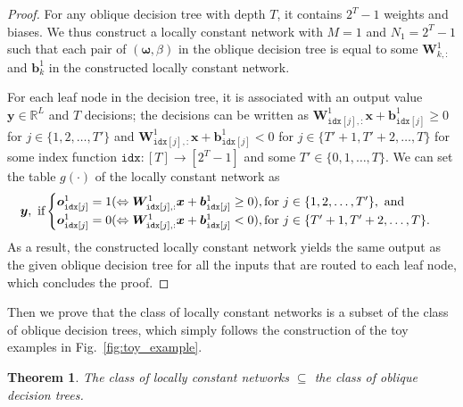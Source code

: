 \documentclass{article} \usepackage{iclr2020_conference,times}
\newtheorem{theorem}{Theorem}\newtheorem{definition}[theorem]{Definition}
\def\vb{{\bm{b}}}
\def\vo{{\bm{o}}}
\def\vomega{{\bm{\omega}}}
\def\vx{{\bm{x}}}
\def\vy{{\bm{y}}}
\def\mW{{\bm{W}}}
\def\sR{{\mathbb{R}}}
\def\idx{{\texttt{idx}}}
\begin{document}
\begin{proof}
For any oblique decision tree with depth $T$, it contains $2^{T}-1$ weights and biases. We thus construct a locally constant network with $M=1$ and $N_1 = 2^{T}-1$ such that each pair of $(\vomega, \beta)$ in the oblique decision tree is equal to some $\mW^1_{k, :}$ and $\vb^1_k$ in the constructed locally constant network. 

For each leaf node in the decision tree, it is associated with an output value $\vy \in \sR^L$ and $T$ decisions; the decisions can be written as $\mW^1_{\idx[j], :} \vx + \vb^1_{\idx[j]} \geq 0$ for $j \in \{1,2,\dots,T'\}$ and $\mW^1_{\idx[j], :} \vx + \vb^1_{\idx[j]} < 0$ for $j \in \{T'+1, T'+2,\dots,T\}$ for some index function $\idx: [T] \to [2^{T}-1]$ and some $T' \in \{0, 1,\dots, T\}$. We can set the table $g(\cdot)$ of the locally constant network as
\begin{align*}
\vspace{-1.5mm}
    \vy, \text{ if}
    \begin{cases}
    \vo^1_{\idx[j]} = 1 (\Leftrightarrow \mW^1_{\idx[j], :} \vx + \vb^1_{\idx[j]} \geq 0), \text{for }j \in \{1,2,\dots,T'\}, \text{ and}\\
    \vo^1_{\idx[j]} = 0 (\Leftrightarrow \mW^1_{\idx[j], :} \vx + \vb^1_{\idx[j]} < 0), \text{for }j \in \{T'+1, T'+2,\dots,T\}.
    \end{cases}
\vspace{-0.5mm}
\end{align*}
As a result, the constructed locally constant network yields the same output as the given oblique decision tree for all the inputs that are routed to each leaf node, which concludes the proof. 
\end{proof}
\vspace{-2mm}
Then we prove that the class of locally constant networks is a subset of the class of oblique decision trees, which simply follows the construction of the toy examples in Fig.~\ref{fig:toy_example}. 
\begin{theorem}
The class of locally constant networks $\subseteq$ the class of oblique decision trees. \label{theorem:convert}
\end{theorem}
\vspace{-2mm}
\end{document}
